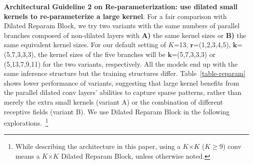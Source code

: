\documentclass[10pt,twocolumn,letterpaper]{article}
\begin{document}
	\begin{table}
		\caption{Models with different efficient extra structures to increase the depth. We report the ImageNet accuracy (Acc), ADE20K mIoU, and actual throughput (Img/s).}
		\label{table-guide1}
		\vspace{-0.2in}
		\begin{center}
		\end{center}
		\vspace{-0.2in}
	\end{table}

\noindent\textbf{Architectural Guideline 2 on Re-parameterization: use dilated small kernels to re-parameterize a large kernel}. For a fair comparison with Dilated Reparam Block, we try two variants with the same numbers of parallel branches composed of non-dilated layers with \textbf{A)} the same kernel sizes or \textbf{B)} the same equivalent kernel sizes. For our default setting of $K$=13, $\bm{r}$=(1,2,3,4,5), $\bm{k}$=(5,7,3,3,3), the kernel sizes of the five branches will be $\bm{k}$=(5,7,3,3,3) or (5,13,7,9,11) for the two variants, respectively. All the models end up with the same inference structure but the training structures differ. Table~\ref{table-reparam} shows lower performance of variants, suggesting that large kernel benefits from the parallel dilated conv layers' abilities to capture sparse patterns, rather than merely the extra small kernels (variant A) or the combination of different receptive fields (variant B). We use Dilated Reparam Block in the following explorations.~\footnote{While describing the architecture in this paper, using a $K$$\times$$K$ ($K$$\geq$9) conv means a $K$$\times$$K$ Dilated Reparam Block, unless otherwise noted.}
\end{document}
